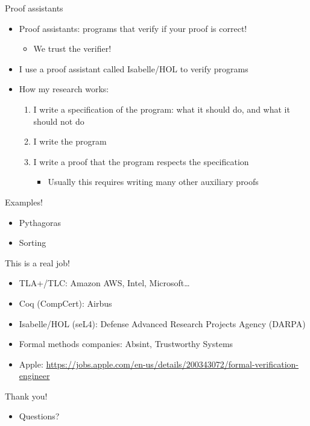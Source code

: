 \documentclass[presentation]{beamer}
\begin{document}
\begin{frame}[label={sec:orga738dca}]{Proof assistants}
\begin{itemize}
\item Proof assistants: programs that verify if your proof is correct!
\begin{itemize}
\item We trust the verifier!
\end{itemize}

\item I use a proof assistant called Isabelle/HOL to verify programs
\item How my research works:
\begin{enumerate}
\item I write a specification of the program: what it should do, and what it should \alert{not} do
\item I write the program
\item I write a proof that the program respects the specification
\begin{itemize}
\item Usually this requires writing many other auxiliary proofs
\end{itemize}
\end{enumerate}
\end{itemize}
\end{frame}
\begin{frame}[label={sec:orge6e44df}]{Examples!}
\begin{itemize}
\item Pythagoras
\item Sorting
\end{itemize}
\end{frame}
\begin{frame}[label={sec:org1256b7e}]{This is a real job!}
\begin{itemize}
\item TLA+/TLC: Amazon AWS, Intel, Microsoft\ldots{}
\item Coq (CompCert): Airbus
\item Isabelle/HOL (seL4): Defense Advanced Research Projects Agency (DARPA)
\item Formal methods companies: Absint, Trustworthy Systems
\item Apple: \url{https://jobs.apple.com/en-us/details/200343072/formal-verification-engineer}
\end{itemize}
\end{frame}
\begin{frame}[label={sec:org3279d51}]{Thank you!}
\begin{itemize}
\item Questions?
\end{itemize}
\end{frame}
\end{document}
